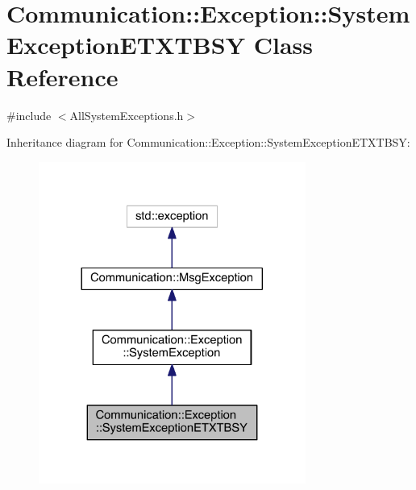 \hypertarget{class_communication_1_1_exception_1_1_system_exception_e_t_x_t_b_s_y}{}\section{Communication\+:\+:Exception\+:\+:System\+Exception\+E\+T\+X\+T\+B\+S\+Y Class Reference}
\label{class_communication_1_1_exception_1_1_system_exception_e_t_x_t_b_s_y}


{\ttfamily \#include $<$All\+System\+Exceptions.\+h$>$}



Inheritance diagram for Communication\+:\+:Exception\+:\+:System\+Exception\+E\+T\+X\+T\+B\+S\+Y\+:\nopagebreak
\begin{figure}[H]
\begin{center}
\leavevmode
\includegraphics[width=248pt]{class_communication_1_1_exception_1_1_system_exception_e_t_x_t_b_s_y__inherit__graph}
\end{center}
\end{figure}


